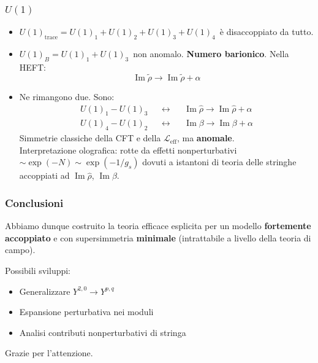 \documentclass[aspectratio=43,mathserif]{beamer}
\newcommand{\hatt}[1]{\ensuremath{\widehat{#1}}}
\newcommand{\tildd}[1]{\ensuremath{\widetilde{#1}}}
\renewcommand{\Im}{\ensuremath{\operatorname{Im}}}
\newcommand{\leff}{\ensuremath{\mathcal{L}_\text{eff}}}
\begin{document}
\begin{frame}
	\frametitle{$U(1)$}

	\begin{itemize}
		\vfill\item \small$U(1)_\text{trace} = U(1)_1 + U(1)_2 + U(1)_3 + U(1)_4$\normalsize \, è disaccoppiato da tutto.
		\vfill\item \small$U(1)_B = U(1)_1 + U(1)_3$\normalsize \, non anomalo. \textbf{Numero barionico}. Nella HEFT:
			\begin{equation}
				\Im \tildd \rho \rightarrow \Im \tildd \rho + \alpha
				\label{}
			\end{equation}

		\vfill\vspace{-2pt}\item Ne rimangono due. Sono: \vspace{-4pt}
			\begin{align}
				U(1)_1 - U(1)_3 &&\leftrightarrow && \Im \hatt \rho \rightarrow \Im \hatt \rho + \alpha\\
				U(1)_4 - U(1)_2 &&\leftrightarrow &&\Im\beta \rightarrow \Im\beta + \alpha
			\end{align}
			Simmetrie classiche della CFT e della $\leff$, ma \textbf{anomale}.\\ Interpretazione olografica: rotte da effetti nonperturbativi $\sim \exp(-N) \sim \exp(-1/g_s)$ dovuti a istantoni di teoria delle stringhe accoppiati ad $\Im\hatt\rho$, $\Im\beta$.

	\end{itemize}
\end{frame}

\begin{frame}
	\begin{center}
		\frametitle{Conclusioni}
		
		Abbiamo dunque costruito la teoria efficace esplicita per un modello \textbf{fortemente accoppiato} e con supersimmetria \textbf{minimale} (intrattabile a livello della teoria di campo).
	\end{center}

		Possibili sviluppi:
\vfill
		\begin{itemize}
			\item Generalizzare $Y^{2,0} \rightarrow Y^{p,q}$
\vfill			\item Espansione perturbativa nei moduli
\vfill	\item Analisi contributi nonperturbativi di stringa
		\end{itemize}
\vfill
	\begin{center}
		Grazie per l'attenzione.
	\end{center}
\end{frame}
\end{document}
